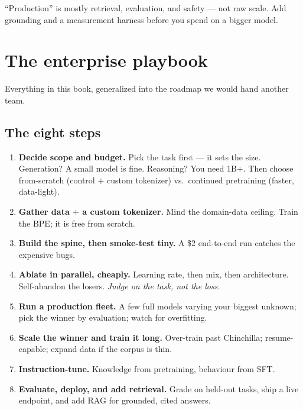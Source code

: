 
\begin{lesson}
``Production'' is mostly retrieval, evaluation, and safety --- not raw scale. Add grounding and a measurement
harness before you spend on a bigger model.
\end{lesson}

\chapter{The enterprise playbook}

Everything in this book, generalized into the roadmap we would hand another team.

\section{The eight steps}
\begin{enumerate}[leftmargin=2.2em]
  \item \textbf{Decide scope and budget.} Pick the task first --- it sets the size. Generation? A small model
  is fine. Reasoning? You need 1B$+$. Then choose from-scratch (control $+$ custom tokenizer) vs.\ continued
  pretraining (faster, data-light).
  \item \textbf{Gather data $+$ a custom tokenizer.} Mind the domain-data ceiling. Train the BPE; it is free
  from scratch.
  \item \textbf{Build the spine, then smoke-test tiny.} A \$2 end-to-end run catches the expensive bugs.
  \item \textbf{Ablate in parallel, cheaply.} Learning rate, then mix, then architecture. Self-abandon the
  losers. \emph{Judge on the task, not the loss.}
  \item \textbf{Run a production fleet.} A few full models varying your biggest unknown; pick the winner by
  evaluation; watch for overfitting.
  \item \textbf{Scale the winner and train it long.} Over-train past Chinchilla; resume-capable; expand data
  if the corpus is thin.
  \item \textbf{Instruction-tune.} Knowledge from pretraining, behaviour from SFT.
  \item \textbf{Evaluate, deploy, and add retrieval.} Grade on held-out tasks, ship a live endpoint, and add
  RAG for grounded, cited answers.
\end{enumerate}

